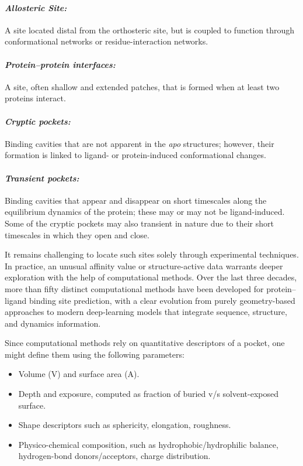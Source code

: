 \documentclass[12pt]{article}
\begin{document}
 \paragraph{\textit{Allosteric Site:}} A site located distal from the orthosteric site, but is coupled to function through conformational networks or residue-interaction networks.

\paragraph{\textit{Protein--protein interfaces:}} A site, often shallow and extended patches, that is formed when at least two proteins interact. 

\paragraph{\textit{Cryptic pockets:}} Binding cavities that are not apparent in the \emph{apo} structures; however, their formation is linked to ligand- or protein-induced conformational changes.

\paragraph{\textit{Transient pockets:}} Binding cavities that appear and disappear on short timescales along the equilibrium dynamics of the protein; these may or may not be ligand-induced. Some of the cryptic pockets may also transient in nature due to their short timescales in which they open and close.


It remains challenging to locate such sites solely through experimental techniques. In practice, an unusual affinity value or structure-active data warrants deeper exploration with the help of computational methods. Over the last three decades, more than fifty distinct computational methods have been developed for protein--ligand binding site prediction, with a clear evolution from purely geometry-based approaches to modern deep-learning models that integrate sequence, structure, and dynamics information.\cite{CH5_ghersi2011beyond,CH5_zhao2020exploring,CH5_LeGuilloux2009}

Since computational methods rely on quantitative descriptors of a pocket, one might define them using the following parameters:
\begin{itemize}
    \item Volume (V) and surface area (A).
    \item Depth and exposure, computed as fraction of buried v/s solvent-exposed surface.
    \item Shape descriptors such as sphericity, elongation, roughness.
    \item Physico-chemical composition, such as hydrophobic/hydrophilic balance, hydrogen-bond donors/acceptors, charge distribution.
\end{itemize}
\end{document}
